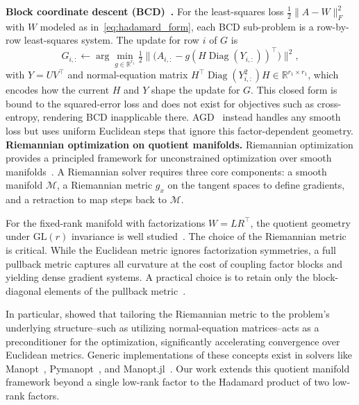 \documentclass[letterpaper, 10 pt, conference]{ieeeconf}
\newcommand{\R}{\mathbb{R}}
\newcommand{\diag}{\operatorname{Diag}}
\theoremstyle{plain}
\theoremstyle{definition}
\theoremstyle{remark}
\newcommand{\BMmod}[1]{{\color{blue}#1}}%
\begin{document}
\noindent\textbf{Block coordinate descent (BCD)~\cite{wertz2024bcd}.} 
For the least-squares loss $\tfrac{1}{2}\|A - W\|_F^2$ with $W$ modeled as in~\eqref{eq:hadamard_form}, each BCD sub-problem is a row-by-row least-squares system. The update for row $i$ of $G$ is
\begin{equation}
  G_{i,:} \leftarrow \arg\min_{g\in\R^{r_1}} \tfrac{1}{2}\bigl\|\bigl(A_{i,:} - g(H\diag(Y_{i,:}))^\top\bigr)\bigr\|^2,
  \label{eq:bcd_sub}
\end{equation}
with $Y = UV^\top$ and normal-equation matrix $H^\top\diag(Y_{i,:}^2)H \in \R^{r_1\times r_1}$, which encodes how the current $H$ and $Y$ shape the update for $G$. This closed form is bound to the squared-error loss and does not exist for objectives such as cross-entropy, rendering BCD inapplicable there. AGD~\cite{ciaperoni2024hadamard} instead handles any smooth loss but uses uniform Euclidean steps that ignore this factor-dependent geometry.\\




\noindent \textbf{Riemannian optimization on quotient manifolds.} 
Riemannian optimization provides a principled framework for unconstrained optimization over smooth manifolds~\cite{absilbook, boumal2023introduction}. A Riemannian solver requires three core components: a smooth manifold $\mathcal{M}$, a Riemannian metric $g_x$ on the tangent spaces to define gradients, and a retraction to map steps back to $\mathcal{M}$. 

For the fixed-rank manifold with factorizations $W = LR^\top$, the quotient geometry under $\text{GL}(r)$ invariance is well studied~\cite{vandereycken2013low, mishra2014r3mc}. The choice of the Riemannian metric is critical. While the Euclidean metric ignores factorization symmetries, a full pullback metric captures all curvature at the cost of coupling factor blocks and yielding dense gradient systems. A practical choice is to retain only the block-diagonal elements of the pullback metric~\cite{mishra2012riemannian}.

In particular, \citet{mishra2016riemannian} showed that tailoring the Riemannian metric to the problem's underlying structure--such as utilizing normal-equation matrices--acts as a  preconditioner for the optimization, significantly accelerating convergence over Euclidean metrics. Generic implementations of these concepts exist in solvers like Manopt~\cite{manopt}, Pymanopt~\cite{pymanopt}, and Manopt.jl~\cite{manoptjl}. Our work extends this quotient manifold framework beyond a single low-rank factor to the Hadamard product of two low-rank factors. 
\end{document}

